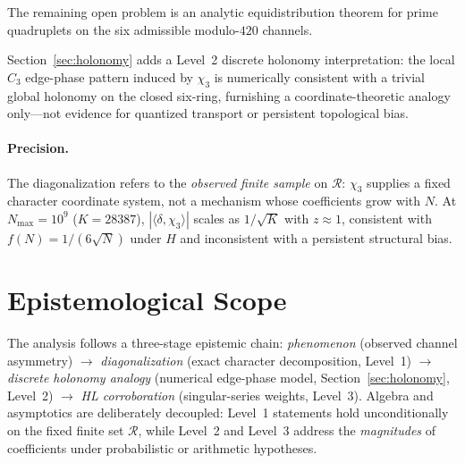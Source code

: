 \documentclass[11pt,a4paper]{article}
\newcommand{\R}{\mathcal{R}}
\begin{document}
The remaining open problem is an analytic equidistribution theorem for
prime quadruplets on the six admissible modulo-$420$ channels.

Section~\ref{sec:holonomy} adds a Level~2 discrete holonomy interpretation:
the local $C_3$ edge-phase pattern induced by $\chi_3$ is numerically
consistent with a trivial global holonomy on the closed six-ring, furnishing
a coordinate-theoretic analogy only---not evidence for quantized transport
or persistent topological bias.

\paragraph{Precision.}
The diagonalization refers to the \emph{observed finite sample} on $\R$:
$\chi_3$ supplies a fixed character coordinate system, not a mechanism whose
coefficients grow with $N$.
At $N_{\max}=10^9$ ($K=28387$), $|\langle\delta,\chi_3\rangle|$ scales as
$1/\sqrt{K}$ with $z\approx 1$, consistent with $f(N)=1/(6\sqrt{N})$ under $H$
and inconsistent with a persistent structural bias.

\section{Epistemological Scope}

The analysis follows a three-stage epistemic chain:
\emph{phenomenon} (observed channel asymmetry)
$\to$ \emph{diagonalization} (exact character decomposition, Level~1)
$\to$ \emph{discrete holonomy analogy} (numerical edge-phase model,
Section~\ref{sec:holonomy}, Level~2)
$\to$ \emph{HL corroboration} (singular-series weights, Level~3).
Algebra and asymptotics are deliberately decoupled:
Level~1 statements hold unconditionally on the fixed finite set $\R$,
while Level~2 and Level~3 address the \emph{magnitudes} of coefficients
under probabilistic or arithmetic hypotheses.
\end{document}
